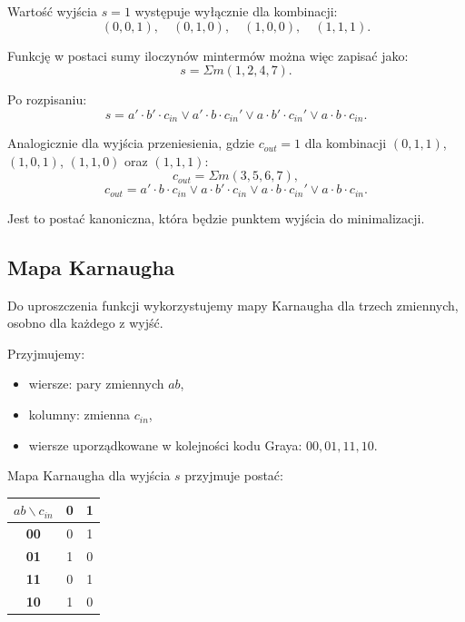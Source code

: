 \documentclass[12pt,a4paper]{article}
\begin{document}
Wartość wyjścia $s = 1$ występuje wyłącznie dla kombinacji:
\begin{equation*}
(0,0,1), \quad (0,1,0), \quad (1,0,0), \quad (1,1,1).
\end{equation*}

Funkcję w postaci sumy iloczynów mintermów można więc zapisać jako:
\begin{equation*}
s = \Sigma m(1, 2, 4, 7).
\end{equation*}

Po rozpisaniu:
\begin{equation*}
s = a' \cdot b' \cdot c_{in} \vee a' \cdot b \cdot c_{in}' \vee a \cdot b' \cdot c_{in}' \vee a \cdot b \cdot c_{in}.
\end{equation*}

Analogicznie dla wyjścia przeniesienia, gdzie $c_{out} = 1$ dla kombinacji $(0,1,1)$, $(1,0,1)$, $(1,1,0)$ oraz $(1,1,1)$:
\begin{equation*}
c_{out} = \Sigma m(3, 5, 6, 7),
\end{equation*}
\begin{equation*}
c_{out} = a' \cdot b \cdot c_{in} \vee a \cdot b' \cdot c_{in} \vee a \cdot b \cdot c_{in}' \vee a \cdot b \cdot c_{in}.
\end{equation*}

Jest to postać kanoniczna, która będzie punktem wyjścia do minimalizacji.

\subsection{Mapa Karnaugha}

Do uproszczenia funkcji wykorzystujemy mapy Karnaugha dla trzech zmiennych, osobno dla każdego z wyjść.

Przyjmujemy:
\begin{itemize}
    \item wiersze: pary zmiennych $ab$,
    \item kolumny: zmienna $c_{in}$,
    \item wiersze uporządkowane w kolejności kodu Graya: $00, 01, 11, 10$.
\end{itemize}

Mapa Karnaugha dla wyjścia $s$ przyjmuje postać:

\begin{center}
\begin{tabular}{|c|c|c|}
\hline
$ab \backslash c_{in}$ & \textbf{0} & \textbf{1} \\
\hline
\textbf{00} & 0 & 1 \\
\hline
\textbf{01} & 1 & 0 \\
\hline
\textbf{11} & 0 & 1 \\
\hline
\textbf{10} & 1 & 0 \\
\hline
\end{tabular}
\end{center}
\end{document}
